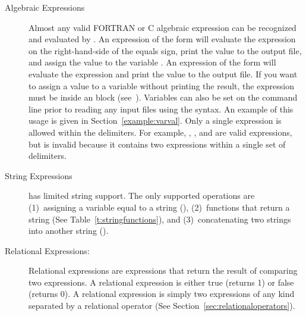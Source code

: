 \begin{description}
\item[Algebraic Expressions] Almost any valid FORTRAN or C algebraic expression
can be recognized and evaluated by \aprepro{}. An expression of the
form
 will evaluate the expression on the right-hand-side
of the equals sign, print the value to the output file, and assign the
value to the variable . An expression of the form
 will evaluate the expression and print the value to
the output file. If you want to assign a value to a variable without
printing the result, the expression must be inside an
 block (see~\pageref{echo}). Variables can
also be set on the command line prior to reading any input files using
the  syntax. An example of this usage is given in
Section~\ref{example:varval}. Only a single expression is allowed
within the \cmd{\{ \}} delimiters. For example,
, ,
and are valid expressions, but 
is invalid because it contains two expressions within a single set of
delimiters.

\item[String Expressions] \aprepro{} has limited string support.
The only supported operations are (1)~assigning a variable equal to a
string (), (2)~functions
that return a string (See Table~\ref{t:stringfunctions}), and (3)~concatenating two strings into another
string ().

\item[Relational Expressions:] Relational expressions are expressions that
return the result of comparing two expressions. A relational
expression is either true (returns 1) or false (returns 0). A
relational expression is simply two expressions of any kind separated
by a relational operator (See Section~\ref{sec:relationaloperators}).


\end{description}
